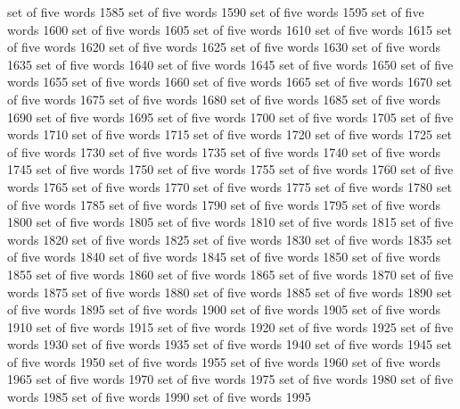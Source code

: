 set	of	five	words	1585
set	of	five	words	1590
set	of	five	words	1595
set	of	five	words	1600
set	of	five	words	1605
set	of	five	words	1610
set	of	five	words	1615
set	of	five	words	1620
set	of	five	words	1625
set	of	five	words	1630
set	of	five	words	1635
set	of	five	words	1640
set	of	five	words	1645
set	of	five	words	1650
set	of	five	words	1655
set	of	five	words	1660
set	of	five	words	1665
set	of	five	words	1670
set	of	five	words	1675
set	of	five	words	1680
set	of	five	words	1685
set	of	five	words	1690
set	of	five	words	1695
set	of	five	words	1700
set	of	five	words	1705
set	of	five	words	1710
set	of	five	words	1715
set	of	five	words	1720
set	of	five	words	1725
set	of	five	words	1730
set	of	five	words	1735
set	of	five	words	1740
set	of	five	words	1745
set	of	five	words	1750
set	of	five	words	1755
set	of	five	words	1760
set	of	five	words	1765
set	of	five	words	1770
set	of	five	words	1775
set	of	five	words	1780
set	of	five	words	1785
set	of	five	words	1790
set	of	five	words	1795
set	of	five	words	1800
set	of	five	words	1805
set	of	five	words	1810
set	of	five	words	1815
set	of	five	words	1820
set	of	five	words	1825
set	of	five	words	1830
set	of	five	words	1835
set	of	five	words	1840
set	of	five	words	1845
set	of	five	words	1850
set	of	five	words	1855
set	of	five	words	1860
set	of	five	words	1865
set	of	five	words	1870
set	of	five	words	1875
set	of	five	words	1880
set	of	five	words	1885
set	of	five	words	1890
set	of	five	words	1895
set	of	five	words	1900
set	of	five	words	1905
set	of	five	words	1910
set	of	five	words	1915
set	of	five	words	1920
set	of	five	words	1925
set	of	five	words	1930
set	of	five	words	1935
set	of	five	words	1940
set	of	five	words	1945
set	of	five	words	1950
set	of	five	words	1955
set	of	five	words	1960
set	of	five	words	1965
set	of	five	words	1970
set	of	five	words	1975
set	of	five	words	1980
set	of	five	words	1985
set	of	five	words	1990
set	of	five	words	1995
